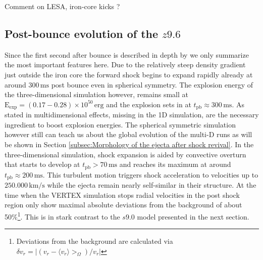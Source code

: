 \documentclass[fleqn,usenatbib]{mnras}
\newcommand{\tpb}{\ensuremath{t_{\text{pb}}}}
\newcommand{\kms}{\ensuremath{\mathrm{km/s}}\xspace}
\newcommand{\vertex}{\textsc{V{\footnotesize ERTEX}}\xspace}
\newcommand{\COM}[1]{{\color{orange}#1}}
\begin{document}
\COM{Comment on LESA, iron-core kicks ?}
\subsection{Post-bounce evolution of the $z9.6$}
Since the first second after bounce is described in depth by \citet{Melson2015a} we only summarize the most important features here. 
Due to the relatively steep density gradient just outside the iron core the forward shock begins to expand rapidly already at around $300\,\text{ms}$ post bounce even in spherical symmetry. The explosion energy of the three-dimensional simulation however, remains small at $\mathrm{E_{exp}}=(0.17-0.28)\times 10^{50} \, \text{erg}$ and the explosion sets in at $\tpb \approx 300\,\text{ms}$. As stated in \cite{Melson2015} multidimensional effects, missing in the 1D simulation, are the necessary ingredient to boost explosion energies. The spherical symmetric simulation however still can teach us about the global evolution of the multi-D runs as will be shown in Section \ref{subsec:Morphology of the ejecta after shock revival}.
In the three-dimensional simulation, shock expansion is aided by convective overturn that starts to develop at $\tpb > 70\,\text{ms} $ and reaches its maximum at around $\tpb \approx 200\,\text{ms}$. This turbulent motion triggers shock acceleration to velocities up to $\mathrm{250.000\,\kms}$ while the ejecta remain nearly self-similar in their structure. 
At the time when the \vertex simulation stops radial velocities in the post shock region only show maximal absolute deviations from the background of about 50\%\footnote{Deviations from the background are calculated via $\delta v_r = | (v_r - \langle v_r \rangle>_{\Omega}) / v_r |$}. This is in stark contrast to the $s9.0$ model presented in the next section. 
\end{document}
